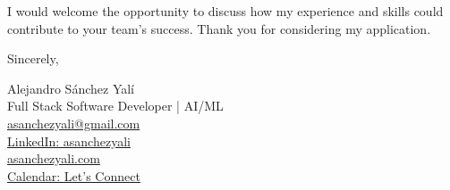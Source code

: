 \documentclass[11pt]{letter}
\begin{document}
\begin{letter}{}
I would welcome the opportunity to discuss how my experience and skills could contribute to your team's success. Thank you for considering my application.

\closing{Sincerely,}

\vspace{12pt}
Alejandro Sánchez Yalí\\
Full Stack Software Developer | AI/ML\\
\href{mailto:asanchezyali@gmail.com}{asanchezyali@gmail.com}\\
\href{https://www.linkedin.com/in/asanchezyali}{LinkedIn: asanchezyali}\\
\href{https://asanchezyali.com}{asanchezyali.com}\\
\href{https://cal.com/asanchezyali/full-time-opportunities}{Calendar: Let's Connect}
\end{letter}
\end{document}
